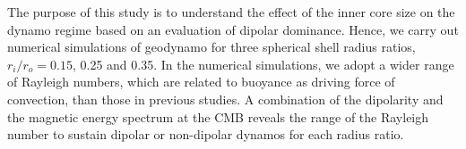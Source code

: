 The purpose of this study is to understand the effect of the inner core size on the dynamo regime based on an evaluation of dipolar dominance.
Hence, we carry out numerical simulations of geodynamo for three spherical shell radius ratios, 
$r_{i} / r_{o} = 0.15$, 0.25 and 0.35. 
In the numerical simulations, we adopt a wider range of Rayleigh numbers, which are related to buoyance as driving force of convection, than those in previous studies.
A combination of the dipolarity and the magnetic energy spectrum at the CMB reveals the range of the Rayleigh number to sustain dipolar or non-dipolar dynamos for each radius ratio.
